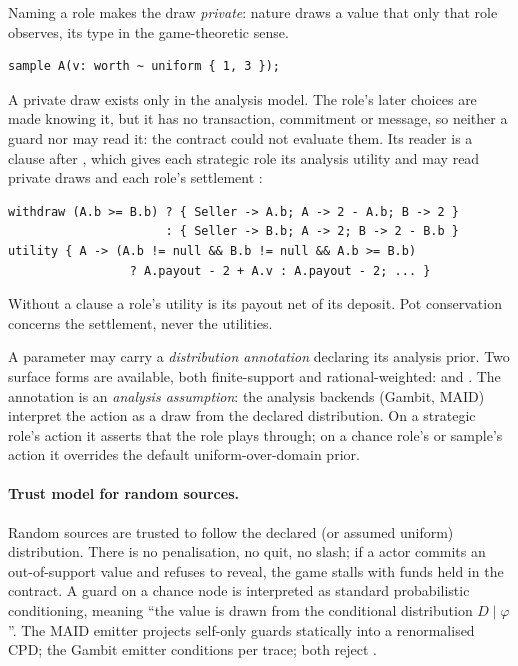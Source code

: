 Naming a role makes the draw \emph{private}: nature draws a value
that only that role observes, its type in the game-theoretic sense.
\begin{lstlisting}[style=vg]
sample A(v: worth ~ uniform { 1, 3 });
\end{lstlisting}
A private draw exists only in the analysis model.  The role's later
choices are made knowing it, but it has no transaction, commitment or
message, so neither a guard nor  may read it: the contract
could not evaluate them.  Its reader is a  clause after
, which gives each strategic role its analysis utility and
may read private draws and each role's settlement :
\begin{lstlisting}[style=vg]
withdraw (A.b >= B.b) ? { Seller -> A.b; A -> 2 - A.b; B -> 2 }
                      : { Seller -> B.b; A -> 2; B -> 2 - B.b }
utility { A -> (A.b != null && B.b != null && A.b >= B.b)
                 ? A.payout - 2 + A.v : A.payout - 2; ... }
\end{lstlisting}
Without a clause a role's utility is its payout net of its deposit.
Pot conservation concerns the settlement, never the utilities.

A parameter may carry a \emph{distribution annotation}
 declaring its analysis prior.  Two surface
forms are available, both finite-support and rational-weighted:
 and
.
The annotation is an \emph{analysis assumption}: the analysis
backends (Gambit, MAID) interpret the action as a draw from the
declared distribution.  On a strategic role's action it asserts
that the role plays through; on a chance role's or sample's
action it overrides the default uniform-over-domain prior.

\paragraph{Trust model for random sources.}
Random sources are trusted to follow the declared (or assumed
uniform) distribution.  There is no penalisation, no quit, no
slash; if a  actor commits an out-of-support value and
refuses to reveal, the game stalls with funds held in the
contract.  A guard on a chance node is interpreted as standard
probabilistic conditioning,  meaning
``the value is drawn from the conditional distribution $D \mid
\varphi$''.  The MAID emitter projects self-only guards
statically into a renormalised CPD; the Gambit emitter
conditions per trace; both reject .

